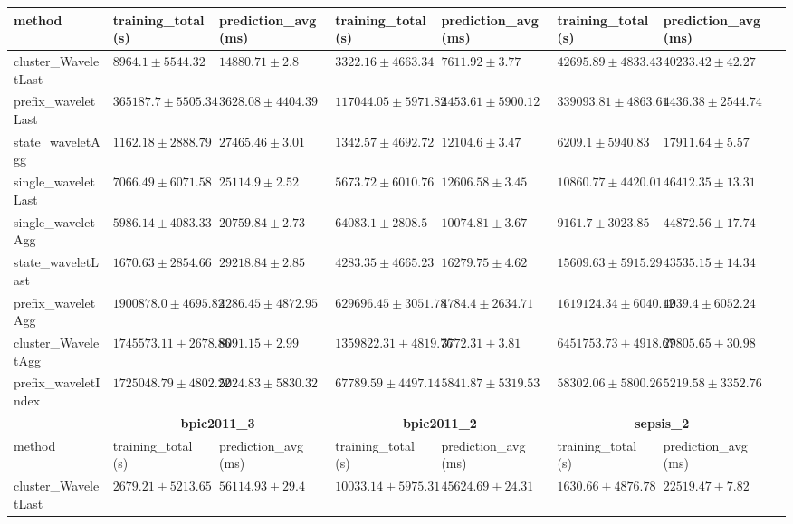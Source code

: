 \documentclass[twoside,11pt]{Latex/Classes/PhDthesisPSnPDF}
\begin{document}
\begin{table}[h]
{\begin{tabular}{llllllll}
		method  & training\_total (s) & prediction\_avg (ms) & training\_total (s) & prediction\_avg (ms) & training\_total (s) & prediction\_avg (ms) \\ \midrule
		cluster\_WaveletLast & $8964.1 \pm 5544.32$ & $14880.71 \pm 2.8$ & $3322.16 \pm 4663.34$ & $7611.92 \pm 3.77$ & $42695.89 \pm 4833.43$ & $40233.42 \pm 42.27$ \\ 
		prefix\_waveletLast & $365187.7 \pm 5505.34$ & $\mathbf{3628.08 \pm 4404.39}$ & $117044.05 \pm 5971.82$ & $4453.61 \pm 5900.12$ & $339093.81 \pm 4863.61$ & $4436.38 \pm 2544.74$ \\ 
		state\_waveletAgg & $\mathbf{1162.18 \pm 2888.79}$ & $27465.46 \pm 3.01$ & $\mathbf{1342.57 \pm 4692.72}$ & $12104.6 \pm 3.47$ & $\mathbf{6209.1 \pm 5940.83}$ & $17911.64 \pm 5.57$ \\ 
		single\_waveletLast & $7066.49 \pm 6071.58$ & $25114.9 \pm 2.52$ & $5673.72 \pm 6010.76$ & $12606.58 \pm 3.45$ & $10860.77 \pm 4420.01$ & $46412.35 \pm 13.31$ \\ 
		single\_waveletAgg & $5986.14 \pm 4083.33$ & $20759.84 \pm 2.73$ & $64083.1 \pm 2808.5$ & $10074.81 \pm 3.67$ & $9161.7 \pm 3023.85$ & $44872.56 \pm 17.74$ \\ 
		state\_waveletLast & $1670.63 \pm 2854.66$ & $29218.84 \pm 2.85$ & $4283.35 \pm 4665.23$ & $16279.75 \pm 4.62$ & $15609.63 \pm 5915.29$ & $43535.15 \pm 14.34$ \\ 
		prefix\_waveletAgg & $1900878.0 \pm 4695.82$ & $4286.45 \pm 4872.95$ & $629696.45 \pm 3051.78$ & $4784.4 \pm 2634.71$ & $1619124.34 \pm 6040.12$ & $\mathbf{4039.4 \pm 6052.24}$ \\ 
		cluster\_WaveletAgg & $1745573.11 \pm 2678.86$ & $8091.15 \pm 2.99$ & $1359822.31 \pm 4819.76$ & $\mathbf{3772.31 \pm 3.81}$ & $6451753.73 \pm 4918.67$ & $29805.65 \pm 30.98$ \\ 
		prefix\_waveletIndex & $1725048.79 \pm 4802.22$ & $5024.83 \pm 5830.32$ & $67789.59 \pm 4497.14$ & $5841.87 \pm 5319.53$ & $58302.06 \pm 5800.26$ & $5219.58 \pm 3352.76$ \\ 
		\bottomrule
		\toprule
		& \multicolumn{2}{c}{{\bfseries bpic2011\_3}} & \multicolumn{2}{c}{{\bfseries bpic2011\_2}} & \multicolumn{2}{c}{{\bfseries sepsis\_2}} \\ \cmidrule(lr){2-3} \cmidrule(lr){4-5} \cmidrule(lr){6-7}
		method  & training\_total (s) & prediction\_avg (ms) & training\_total (s) & prediction\_avg (ms) & training\_total (s) & prediction\_avg (ms) \\ \midrule
		cluster\_WaveletLast & $\mathbf{2679.21 \pm 5213.65}$ & $56114.93 \pm 29.4$ & $10033.14 \pm 5975.31$ & $45624.69 \pm 24.31$ & $1630.66 \pm 4876.78$ & $22519.47 \pm 7.82$ \\ 

\end{tabular}}
\end{table}
\end{document}
